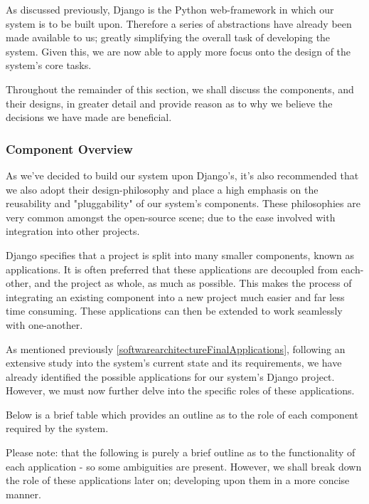 		As discussed previously, Django is the Python web-framework in which our system is to be built upon. Therefore a series of abstractions have already been made available to us; greatly simplifying the overall task of developing the system. Given this, we are now able to apply more focus onto the design of the system's core tasks.
		
		Throughout the remainder of this section, we shall discuss the components, and their designs, in greater detail and provide reason as to why we believe the decisions we have made are beneficial.
	
	\subsubsection{Component Overview}
		As we've decided to build our system upon Django's, it's also recommended that we also adopt their design-philosophy and place a high emphasis on the reusability and "pluggability" of our system's components. These philosophies are very common amongst the open-source scene; due to the ease involved with integration into other projects.
		
		Django specifies that a project is split into many smaller components, known as applications. It is often preferred that these applications are decoupled from each-other, and the project as whole, as much as possible. This makes the process of integrating an existing component into a new project much easier and far less time consuming. These applications can then be extended to work seamlessly with one-another.
		
		As mentioned previously \ref{softwarearchitectureFinalApplications}, following an extensive study into the system's current state and its requirements, we have already identified the possible applications for our system's Django project. However, we must now further delve into the specific roles of these applications.
		
		Below is a brief table which provides an outline as to the role of each component required by the system.
		
		Please note: that the following is purely a brief outline as to the functionality of each application - so some ambiguities are present.
		However, we shall break down the role of these applications later on; developing upon them in a more concise manner.
		
